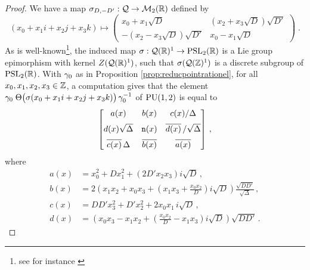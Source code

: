 \documentclass[11pt]{article}
\begin{document}
\begin{proof}
We have a map $\sigma_{D,-D'}: {\cal Q}\to{\cal M}_2({\mathbb R})$ defined by
$$
(x_0+x_1i+x_2j+x_3k)\mapsto\begin{pmatrix}
x_0+x_1\sqrt D & (x_2+x_3\sqrt D)\sqrt{D'}\\
-(x_2-x_3\sqrt D)\sqrt{D'} & x_0-x_1\sqrt D
\end{pmatrix}\;.
$$ 
As is well-known\footnote{see for instance \cite{Katok92}}, the
induced map $\sigma: {\cal Q}({\mathbb R})^1 \rightarrow\operatorname{PSL}_{2}({\mathbb R})$ is a Lie group
epimorphism with kernel $Z({\cal Q}({\mathbb R})^1)$, such that
$\sigma({\cal Q}({\mathbb Z})^1)$ is a discrete subgroup of $\operatorname{PSL}_{2}({\mathbb R})$.  With $\gamma_0$
as in Proposition \ref{prop:reducpointrationel}, for all
$x_0,x_1,x_2,x_3\in{\mathbb Z}$, a computation gives that the element
$\gamma_0\;\Theta\big(\sigma(x_0+x_1i+x_2j+x_3k)\big)\,\gamma_0^{-1}$ of
$\operatorname{PU}(1,2)$ is equal to 
$$
\begin{bmatrix}
\vspace{.2cm}
a(x)&b(x)&c(x)/\Delta\\
\vspace{.2cm}
d(x)\sqrt\Delta&\n(x)& \overline{d(x)}\,/\sqrt\Delta\\
\overline{c(x)}\,\Delta&\overline{b(x)}&\overline{a(x)}
\end{bmatrix}\,,
$$
where
\begin{align*}
a(x) & =x_0^2 +Dx_1^2 + (2D'x_2x_3)i\sqrt{D}\,,\\
b(x) & =2(x_1x_2 + x_0x_3 + (x_1x_3 +\frac{x_0x_2}{D})i\sqrt{D})
\frac{\sqrt{DD'}}{\sqrt{\Delta}}\,,\\
c(x) & =DD'x_3^2 + D'x_2^2 + 2x_0x_1 \,i\sqrt{D}\,,\\
d(x) & =(x_0x_3 - x_1x_2 +(\frac{x_0x_2}{D}- x_1x_3)i\sqrt{D})\sqrt{DD'}\,.
\end{align*}


\end{proof}
\end{document}

